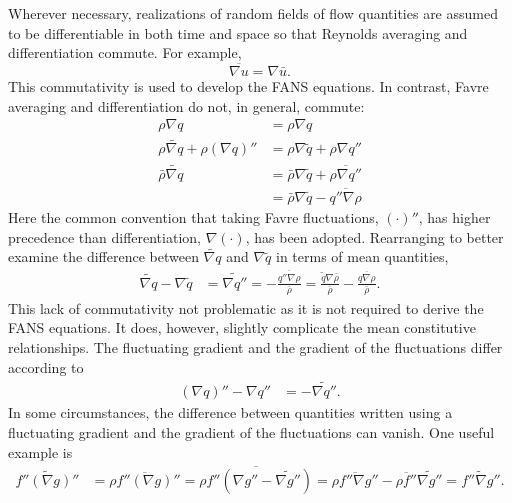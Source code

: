 \documentclass[letterpaper,11pt,nointlimits,reqno,draft]{amsart}
\begin{document}
Wherever necessary, realizations of random fields of flow quantities
are assumed to be differentiable in both time and space so that Reynolds
averaging and differentiation commute.  For example,
%
\begin{equation*}
\overline{ \nabla{}u } = \nabla\bar{u}.
\end{equation*}
%
This commutativity is used to develop the FANS equations.  In contrast, Favre
averaging and differentiation do not, in general, commute:
\begin{align}
  \rho \nabla q &= \rho \nabla q
\\
   \rho \widetilde{\nabla{}q} + \rho \left(\nabla{}q\right)''
&=
   \rho \nabla \tilde{q} + \rho \nabla{}q''
\\
     \bar{\rho} \widetilde{\nabla{}q}
&=
     \bar{\rho} \nabla{\tilde{q}}
   + \overline{\rho \nabla{}q''}
\\
&=
     \bar{\rho} \nabla{\tilde{q}}
   - \overline{q''\nabla\rho}
\end{align}
Here the common convention that taking Favre fluctuations,
$\left(\cdot\right)''$, has higher precedence than differentiation,
$\nabla\left(\cdot\right)$, has been adopted.  Rearranging to better examine
the difference between $\widetilde{\nabla{}q}$ and $\nabla\tilde{q}$ in terms
of mean quantities,
\begin{align}
  \label{eq:favremeancommute}
  \widetilde{\nabla{}q}
  -
  \nabla{\tilde{q}}
&=
  \widetilde{\nabla{}q''}
= - \frac{{\overline{q''\nabla\rho}}}{\bar{\rho}}
= \frac{\tilde{q}\nabla\bar{\rho}}{\bar{\rho}}
  - \frac{\overline{q\nabla\rho}}{\bar{\rho}}
.
\end{align}
This lack of commutativity not problematic as it is not required to derive the
FANS equations.  It does, however, slightly complicate the mean constitutive
relationships.  The fluctuating gradient and the gradient of the fluctuations
differ according to
\begin{align}
  \label{eq:favrefluctcommute}
  \left(\nabla{}q\right)'' - \nabla{}q'' &= - \widetilde{\nabla{}q''}
.
\end{align}
In some circumstances, the difference between quantities written using a
fluctuating gradient and the gradient of the fluctuations can vanish.
One useful example is
\begin{align}
  \label{eq:favrefluctexample}
\widetilde{f''\left(\nabla{}g\right)''}
&=
\overline{\rho{}f''\left(\nabla{}g\right)''}
=
\overline{\rho{}f''\left(\nabla{}g'' - \widetilde{\nabla{}g''}\right)}
=
\overline{\rho{}f''\nabla{}g''}
- \overline{\rho{}f''}\widetilde{\nabla{}g''}
=
\widetilde{f''\nabla{}g''}
.
\end{align}
\end{document}
